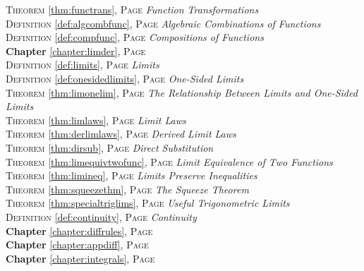 \begin{multicols}{2}
{\textsc{Theorem} \ref{thm:functrans}, \textsc{Page} \pageref{thm:functrans} \textit{Function Transformations} \\
\textsc{Definition} \ref{def:algcombfunc}, \textsc{Page} \pageref{def:algcombfunc} \textit{Algebraic Combinations of Functions} \\
\textsc{Definition} \ref{def:compfunc}, \textsc{Page} \pageref{def:compfunc} \textit{Compositions of Functions} \\
\textbf{Chapter} \ref{chapter:limder}, \textsc{Page} \pageref{chapter:limder} \\
\textsc{Definition} \ref{def:limits}, \textsc{Page} \pageref{def:limits} \textit{Limits} \\
\textsc{Definition} \ref{def:onesidedlimits}, \textsc{Page} \pageref{def:onesidedlimits} \textit{One-Sided Limits} \\
\textsc{Theorem} \ref{thm:limonelim}, \textsc{Page} \pageref{thm:limonelim} \textit{The Relationship Between Limits and One-Sided Limits} \\
\textsc{Theorem} \ref{thm:limlaws}, \textsc{Page} \pageref{thm:limlaws} \textit{Limit Laws} \\
\textsc{Theorem} \ref{thm:derlimlaws}, \textsc{Page} \pageref{thm:derlimlaws} \textit{Derived Limit Laws} \\
\textsc{Theorem} \ref{thm:dirsub}, \textsc{Page} \pageref{thm:dirsub} \textit{Direct Substitution} \\
\textsc{Theorem} \ref{thm:limequivtwofunc}, \textsc{Page} \pageref{thm:limequivtwofunc} \textit{Limit Equivalence of Two Functions} \\
\textsc{Theorem} \ref{thm:limineq}, \textsc{Page} \pageref{thm:limineq} \textit{Limits Preserve Inequalities} \\
\textsc{Theorem} \ref{thm:squeezethm}, \textsc{Page} \pageref{thm:squeezethm} \textit{The Squeeze Theorem} \\
\textsc{Theorem} \ref{thm:specialtriglims}, \textsc{Page} \pageref{thm:specialtriglims} \textit{Useful Trigonometric Limits} \\
\textsc{Definition} \ref{def:continuity}, \textsc{Page} \pageref{def:continuity} \textit{Continuity} \\
\textbf{Chapter} \ref{chapter:diffrules}, \textsc{Page} \pageref{chapter:diffrules} \\
\textbf{Chapter} \ref{chapter:appdiff}, \textsc{Page} \pageref{chapter:appdiff} \\
\textbf{Chapter} \ref{chapter:integrals}, \textsc{Page} \pageref{chapter:integrals} \\

      }
\end{multicols}

